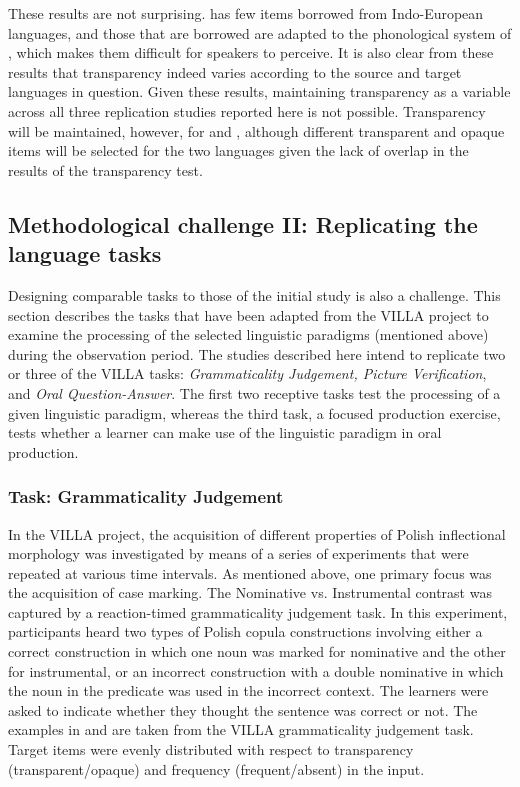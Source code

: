 \documentclass[output=paper,colorlinks,citecolor=brown,modfonts,nonflat]{../langscibook}
\begin{document}
\newpage
These results are not surprising.  has few items borrowed from {Indo-European} languages, and those that are borrowed are adapted to the phonological system of , which makes them difficult for  speakers to perceive. It is also clear from these results that transparency indeed varies according to the source and target languages in question. Given these results, maintaining transparency as a variable across all three replication studies reported here is not possible. Transparency will be maintained, however, for  and , although different transparent and opaque items will be selected for the two languages given the lack of overlap in the results of the transparency test.

\subsection{Methodological challenge II: Replicating the language tasks}\label{sec:watorek:4.2}

Designing comparable tasks to those of the initial study is also a challenge. This section describes the tasks that have been adapted from the VILLA project to examine the processing of the selected linguistic paradigms (mentioned above) during the observation period. The studies described here intend to replicate two or three of the VILLA tasks: \textit{Grammaticality Judgement, Picture Verification}, and \textit{Oral Question-Answer}. The first two receptive tasks test the processing of a given linguistic paradigm, whereas the third task, a focused production exercise, tests whether a learner can make use of the linguistic paradigm in oral production.

\subsubsection{Task: Grammaticality Judgement}

In the VILLA project, the acquisition of different properties of Polish inflectional morphology was investigated by means of a series of experiments that were repeated at various time intervals. As mentioned above, one primary focus was the acquisition of case marking. The Nominative vs. Instrumental contrast was captured by a reaction-timed grammaticality judgement task. In this experiment, participants heard two types of Polish copula constructions involving either a correct construction in which one noun was marked for nominative and the other for instrumental, or an incorrect construction with a double nominative in which the noun in the predicate was used in the incorrect context. The learners were asked to indicate whether they thought the sentence was correct or not. The examples in  and  are taken from the VILLA grammaticality judgement task. Target items were evenly distributed with respect to transparency (transparent/opaque) and frequency (frequent/absent) in the input.
\end{document}
